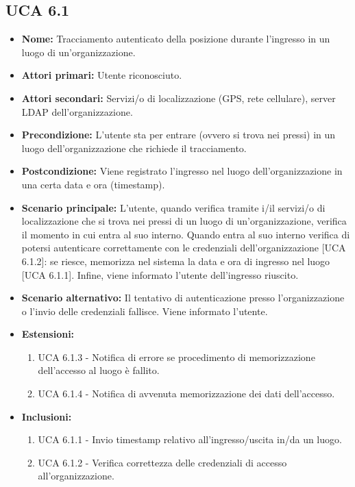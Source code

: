 \subsection{UCA 6.1}%
\begin{itemize}
	\item \textbf{Nome:} Tracciamento autenticato della posizione durante l'ingresso in un luogo di un'organizzazione.
	\item \textbf{Attori primari:} Utente riconosciuto.
	\item \textbf{Attori secondari:} Servizi/o di localizzazione (GPS, rete cellulare), server LDAP dell'organizzazione.
	\item \textbf{Precondizione:} L'utente sta per entrare (ovvero si trova nei pressi) in un luogo dell'organizzazione che richiede il tracciamento.
	\item \textbf{Postcondizione:} Viene registrato l'ingresso nel luogo dell'organizzazione in una certa data e ora (timestamp).
	\item \textbf{Scenario principale:} L'utente, quando verifica tramite i/il servizi/o di localizzazione che si trova nei pressi di un luogo di un'organizzazione, verifica il momento in cui entra al suo interno.
	Quando entra al suo interno verifica di potersi autenticare correttamente con le credenziali dell'organizzazione [UCA 6.1.2]: se riesce, memorizza nel sistema la data e ora di ingresso nel luogo [UCA 6.1.1].
	Infine, viene informato l'utente dell'ingresso riuscito.
	\item \textbf{Scenario alternativo:} Il tentativo di autenticazione presso l'organizzazione o l'invio delle credenziali fallisce. Viene informato l'utente.
	\item \textbf{Estensioni:}
	\begin{enumerate}
		\item UCA 6.1.3 - Notifica di errore se procedimento di memorizzazione dell'accesso al luogo è fallito.
		\item UCA 6.1.4 - Notifica di avvenuta memorizzazione dei dati dell'accesso.
	\end{enumerate}
	\item \textbf{Inclusioni:}
	\begin{enumerate}
		\item UCA 6.1.1 - Invio timestamp relativo all'ingresso/uscita in/da un luogo.
		\item UCA 6.1.2 - Verifica correttezza delle credenziali di accesso all'organizzazione.
	\end{enumerate}
\end{itemize}

